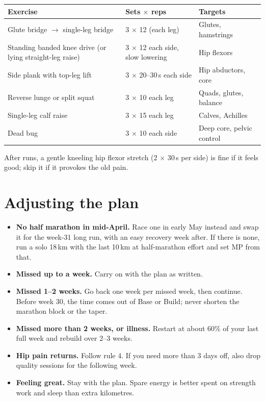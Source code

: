 \documentclass[11pt,a4paper]{article}
\begin{document}
\begin{center}
\begin{tabular}{@{}L{7.4cm}L{3.9cm}L{3.9cm}@{}}
\toprule
\textbf{Exercise} & \textbf{Sets $\times$ reps} & \textbf{Targets} \\
\midrule
Glute bridge $\rightarrow$ single-leg bridge & 3 $\times$ 12 (each leg) & Glutes, hamstrings \\
Standing banded knee drive (or lying straight-leg raise) & 3 $\times$ 12 each side, slow lowering & Hip flexors \\
Side plank with top-leg lift & 3 $\times$ 20--30\,s each side & Hip abductors, core \\
Reverse lunge or split squat & 3 $\times$ 10 each leg & Quads, glutes, balance \\
Single-leg calf raise & 3 $\times$ 15 each leg & Calves, Achilles \\
Dead bug & 3 $\times$ 10 each side & Deep core, pelvic control \\
\bottomrule
\end{tabular}
\end{center}

After runs, a gentle kneeling hip flexor stretch (2 $\times$ 30\,s per side) is fine if it feels good; skip it if it provokes the old pain.

\section*{Adjusting the plan}

\begin{itemize}
  \item \textbf{No half marathon in mid-April.} Race one in early May instead and swap it for the week-31 long run, with an easy recovery week after. If there is none, run a solo 18\,km with the last 10\,km at half-marathon effort and set MP from that.
  \item \textbf{Missed up to a week.} Carry on with the plan as written.
  \item \textbf{Missed 1--2 weeks.} Go back one week per missed week, then continue. Before week 30, the time comes out of Base or Build; never shorten the marathon block or the taper.
  \item \textbf{Missed more than 2 weeks, or illness.} Restart at about 60\% of your last full week and rebuild over 2--3 weeks.
  \item \textbf{Hip pain returns.} Follow rule 4. If you need more than 3 days off, also drop quality sessions for the following week.
  \item \textbf{Feeling great.} Stay with the plan. Spare energy is better spent on strength work and sleep than extra kilometres.
\end{itemize}
\end{document}

